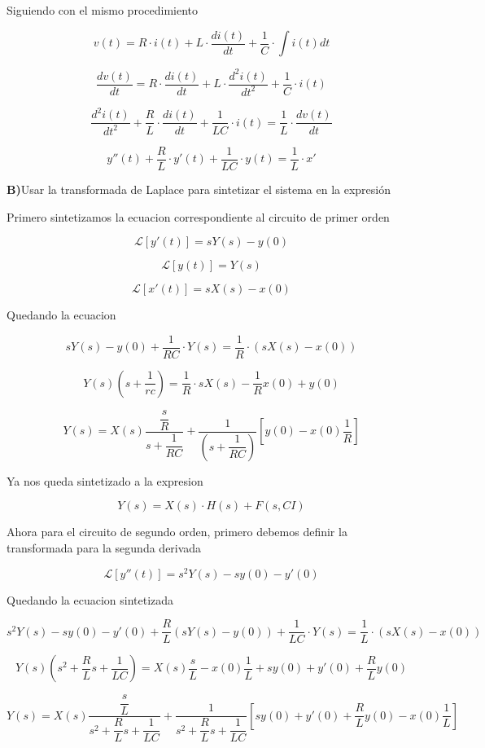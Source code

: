 Siguiendo con el mismo procedimiento

$$v(t) = R \cdot i(t) + L \cdot \dfrac{d i(t)}{dt} + \dfrac{1}{C} \cdot \int i(t) dt$$

$$\dfrac{d v(t)}{dt} = R \cdot \dfrac{d i(t)}{dt} + L \cdot \dfrac{d^2 i(t)}{dt^2} + \dfrac{1}{C} \cdot i(t)$$

$$\dfrac{d^2 i(t)}{dt^2} +  \dfrac{R}{L} \cdot \dfrac{d i(t)}{dt} + \dfrac{1}{LC} \cdot i(t) = \dfrac{1}{L} \cdot \dfrac{d v(t)}{dt} $$

$$y''(t) + \dfrac{R}{L} \cdot y'(t) + \dfrac{1}{LC} \cdot y(t) = \dfrac{1}{L} \cdot x'$$

\textbf{B)}Usar la transformada de Laplace para sintetizar el sistema en la expresión

Primero sintetizamos la ecuacion correspondiente al circuito de primer orden

$$\mathscr{L}[y'(t)] = sY(s) - y(0)$$

$$\mathscr{L}[y(t)] = Y(s)$$

$$\mathscr{L}[x'(t)] = sX(s) - x(0)$$

Quedando la ecuacion

$$sY(s) - y(0) + \dfrac{1}{RC} \cdot Y(s) = \dfrac{1}{R} \cdot (sX(s) - x(0))$$

$$Y(s) (s + \dfrac{1}{rc}) = \dfrac{1}{R} \cdot sX(s) - \dfrac{1}{R} x(0) + y(0)$$

$$Y(s) = X(s)  \dfrac{\dfrac{s}{R}}{s + \dfrac {1}{RC}} + \dfrac{1}{(s + \dfrac{1}{RC})} [y(0) - x(0) \dfrac{1}{R}]$$

Ya nos queda sintetizado a la expresion

$$Y(s) = X(s) \cdot H(s) + F(s,CI)$$

Ahora para el circuito de segundo orden, primero debemos definir la transformada para la segunda derivada

$$\mathscr{L}[y''(t)] = s^2Y(s) - sy(0) - y'(0)$$

Quedando la ecuacion sintetizada

$$ s^2Y(s) - s y(0) - y'(0) + \dfrac{R}{L} (sY(s) - y(0)) + \dfrac{1}{LC} \cdot Y(s) = \dfrac{1}{L} \cdot (sX(s) - x(0))$$

$$ Y(s) (s^2 + \dfrac{R}{L} s + \dfrac{1}{LC}) = X(s) \dfrac{s}{L} - x(0) \dfrac{1}{L} + s y(0) + y'(0) + \dfrac{R}{L} y(0)$$

$$ Y(s) = X(s) \dfrac{\dfrac{s}{L}}{s^2 + \dfrac{R}{L} s + \dfrac{1}{LC}} + \dfrac{1}{s^2 + \dfrac{R}{L} s + \dfrac{1}{LC}} [s y(0) + y'(0) + \dfrac{R}{L} y(0) - x(0) \dfrac{1}{L}]$$

